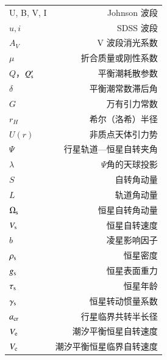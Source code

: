 \begin{multicols}{2}
\begin{tabularx}{0.85\linewidth}{@{\extracolsep{\fill}}lr}
\centering

U, B, V, I		       	 	&      Johnson 波段   		\\
$u,i$		       	 		&      SDSS 波段 		\\
$A_V$		       	 	&      V 波段消光系数   	\\
$\mu$ 				&	折合质量或刚性系数	\\
$Q$，$Q_\mathrm{s}^\prime$ 	&	平衡潮耗散参数		\\
$\delta$ 				&	平衡潮常数滞后角	\\
$G$					&	万有引力常数		\\
$r_H$ 				&	希尔（洛希）半径	\\
$U(r)$ 				&	非质点天体引力势	\\
$\Psi$ 				&   行星轨道---恒星自转夹角 \\
$\lambda$ 			&	$\Psi$角的天球投影	\\
$S$ 					&	自转角动量		\\
$L$ 					&      轨道角动量		\\
$\Omega_\mathrm{s}$ 		&	恒星自转角动量		\\
$V_\mathrm{s}$ 			&	恒星自转速度		\\
$b$ 					&	凌星影响因子		\\
$\rho_\mathrm{s}$         	 	&      恒星密度   		\\
$g_\mathrm{s}$         	 		&      恒星表面重力   		\\
$\tau_\mathrm{s}$        	 	&      恒星年龄   		\\
$\gamma_\mathrm{s}$        	&      恒星转动惯量系数   	\\
$a_\mathrm{cr}$         	 	&      行星临界共转半长径 \\
$V_\mathrm{e}$         	 	&  潮汐平衡恒星自转速度 	\\
$V_\mathrm{c}$         	 	&  潮汐平衡恒星临界自转速度 
\end{tabularx}
\end{multicols}

\newpage


